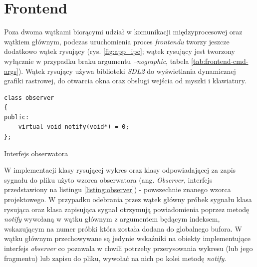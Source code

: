 \newpage

\section{Frontend}

Poza dwoma wątkami biorącymi udział w komunikacji międzyprocesowej oraz wątkiem głównym, 
podczas uruchomienia proces \textit{frontendu} tworzy jeszcze dodatkowo wątek rysujący
(rys. \ref{fig:app_ipc}; wątek rysujący jest tworzony wyłącznie w przypadku braku argumentu \textit{--nographic}, tabela \ref{tab:frontend-cmd-args}). Wątek rysujący używa biblioteki \textit{SDL2} do wyświetlania dynamicznej grafiki rastrowej, do otwarcia
okna oraz obsługi wejścia od myszki i klawiatury. 

\begin{listing}
\begin{verbatim}
class observer
{
public:
    virtual void notify(void*) = 0;
};
\end{verbatim}
    \caption{Interfejs obserwatora}
\label{listing:observer}
\end{listing}

W implementacji klasy rysującej wykres oraz klasy odpowiadającej za zapis sygnału do pliku użyto wzorca obserwatora 
(ang. \textit{Observer}, interfejs przedstawiony na listingu \ref{listing:observer}) - powszechnie znanego wzorca projektowego. 
W przypadku odebrania przez wątek główny próbek sygnału
klasa rysująca oraz klasa zapisująca sygnał otrzymują powiadomienia poprzez metodę \textit{notify} wywołaną w wątku głównym 
z argumentem będącym indeksem, wskazującym na numer próbki która została dodana do globalnego bufora.
W wątku głównym przechowywane są jedynie wskaźniki na obiekty implementujące interfejs \textit{observer} co pozawala w chwili
potrzeby przerysowania wykresu (lub jego fragmentu) lub zapisu do pliku, wywołać na nich po kolei metodę \textit{notify}.

